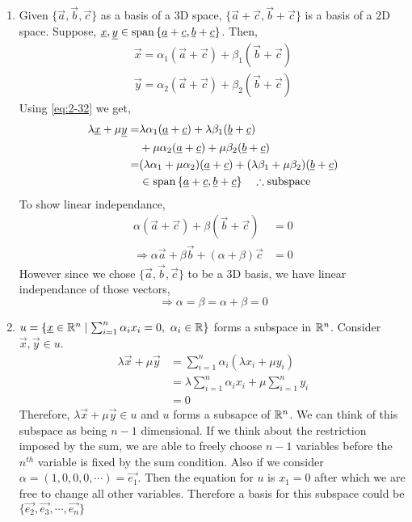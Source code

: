 \documentclass{article}
\numberwithin{equation}{section}
\begin{document}
\begin{eg}\leavevmode
    \begin{enumerate}
    \item Given $\{\vec{a}, \vec{b}, \vec{c}\}$ as a basis of a 3D space, $\{\vec{a} + \vec{c}, \vec{b} + \vec{c}\}$ is a basis of a 2D space.
    Suppose, $\underline{x}, \underline{y} \in \operatorname{span} \left\{ \underline{a} + \underline{c}, \underline{b} + \underline{c} \right\}$. Then,
    \begin{align*}
        \vec{x} = \alpha_1 (\vec{a} + \vec{c}) + \beta_1 (\vec{b} + \vec{c}) \\
        \vec{y} = \alpha_2 (\vec{a} + \vec{c}) + \beta_2 (\vec{b} + \vec{c})
    \end{align*}
    Using \eqref{eq:2-32} we get,
    \begin{align*}
        \lambda\underline{x} + \mu \underline{y} =& \lambda\alpha_1 (\underline{a} + \underline{c}) + \lambda\beta_1 (\underline{b} + \underline{c}) \\
        &+ \mu\alpha_2 (\underline{a} + \underline{c}) + \mu\beta_2 (\underline{b} + \underline{c}) \\
        =& (\lambda\alpha_1 + \mu\alpha_2)(\underline{a} + \underline{c}) + (\lambda\beta_1 + \mu\beta_2)(\underline{b} + \underline{c}) \\
        & \in \operatorname{span} \left\{ \underline{a} + \underline{c}, \underline{b} + \underline{c} \right\} \quad \therefore \text{subspace}
    \end{align*}
    To show linear independance,
    \begin{align*}
        \alpha (\vec{a} + \vec{c}) + \beta (\vec{b} + \vec{c}) &= 0 \\
        \Rightarrow \alpha\vec{a} + \beta \vec{b} + (\alpha + \beta)\vec{c} &= 0
    \end{align*}
    However since we chose $\{\vec{a}, \vec{b}, \vec{c} \}$ to be a 3D basis, we have linear independance of those vectors,
    \[
        \Rightarrow \alpha = \beta = \alpha + \beta = 0  
    \]
    \item $u = \{ \underline{x} \in \mathbb{R}^n \mid \sum_{i=1}^{n}{\alpha_ix_i} = 0, \ \alpha_i \in \mathbb{R}\}$ forms a subspace in $\mathbb{R}^n$.
    Consider $\vec{x}, \vec{y} \in u$.
    \begin{align*}
        \lambda \vec{x} + \mu \vec{y} &= \sum_{i=1}^{n}{\alpha_i(\lambda x_i + \mu y_i)} \\
        &= \lambda\sum_{i=1}^{n}{\alpha_ix_i} + \mu\sum_{i=1}^{n}{y_i} \\
        &= 0
    \end{align*}
    Therefore, $\lambda \vec{x} + \mu \vec{y} \in u$ and $u$ forms a subsapce of $\mathbb{R}^n$. We can think of this subspace as being $n-1$ dimensional. 
    If we think about the restriction imposed by the sum, we are able to freely choose $n-1$ variables before the $n^{th}$ variable is fixed by the sum condition.
    Also if we consider $\alpha = (1, 0, 0, 0, \cdots) = \vec{e_1}$. Then the equation for $u$ is $x_1 = 0$ after which we are free to change all other variables.
    Therefore a basis for this subspace could be $\{\vec{e_2}, \vec{e_3}, \cdots, \vec{e_n}\}$


\end{enumerate}
\end{eg}
\end{document}

